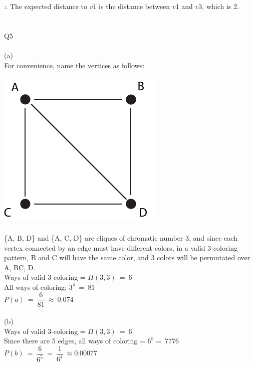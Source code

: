 \documentclass[a4paper]{article}
\begin{document}
$\therefore$ The expected distance to $v1$ is the distance between $v1$ and $v3$, which is 2.\\\\
\\Q5\\
\\(a)\\
For convenience, name the vertices as follows:\\\\
\includegraphics[scale=1]{fig1.pdf}\\\\
\{A, B, D\} and  \{A, C, D\} are cliques of chromatic number 3, and since each vertex connected by an edge must have different colors, in a valid 3-coloring pattern, B and C will have the same color, and 3 colors will be permutated over A, BC, D. \\
Ways of valid 3-coloring = $\Pi(3,3)\ =\ 6$\\
All ways of coloring: $3^{4}\ =\ 81$\\
$P(a)\ =\ \dfrac{6}{81}\ \approx\ 0.074$\\
\\(b)\\
Ways of valid 3-coloring = $\Pi(3,3)\ =\ 6$\\
Since there are 5 edges, all ways of coloring = $6^{5} =\ 7776$\\
$P(b)\ =\ \dfrac{6}{6^{5}}\ =\ \dfrac{1}{6^{4}}\ \approx 0.00077$
\end{document}
